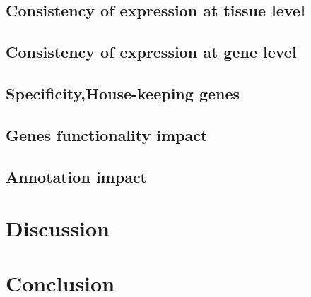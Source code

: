 \subsection{Consistency of expression at tissue level}
\subsection{Consistency of expression at gene level}
\subsection{Specificity,House-keeping genes}
\subsection{Genes functionality impact}
\subsection{Annotation impact}



\section{Discussion}
\section{Conclusion}






